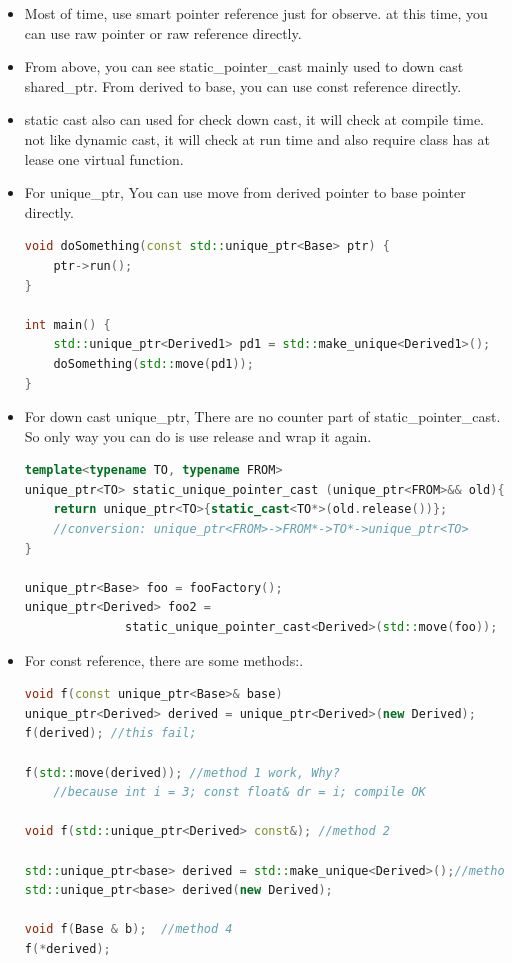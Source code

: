 \documentclass[a4paper,11pt,twoside]{book}
\begin{document}
\begin{itemize}
\item Most of time, use smart pointer reference just for observe. at this time, you can use raw pointer or raw reference directly. 

\item From above, you can see static\_pointer\_cast mainly used to down cast shared\_ptr. From derived to base, you can use const reference directly.

\item static cast also can used for check down cast, it will check at compile time. not like dynamic cast, it will check at run time and also require class has at lease one virtual function.


\item For unique\_ptr, You can use move from derived pointer to base pointer directly.
\begin{lstlisting}[frame=single, language=c++, mathescape=true]
void doSomething(const std::unique_ptr<Base> ptr) {
    ptr->run();
}

int main() {
    std::unique_ptr<Derived1> pd1 = std::make_unique<Derived1>();
    doSomething(std::move(pd1));
}
\end{lstlisting}

\item For down cast unique\_ptr, There are no counter part of static\_pointer\_cast. So only way you can do is use release and wrap it again.

\begin{lstlisting}[frame=single, language=c++, mathescape=true]
template<typename TO, typename FROM>
unique_ptr<TO> static_unique_pointer_cast (unique_ptr<FROM>&& old){
	return unique_ptr<TO>{static_cast<TO*>(old.release())};
	//conversion: unique_ptr<FROM>->FROM*->TO*->unique_ptr<TO>
}

unique_ptr<Base> foo = fooFactory();
unique_ptr<Derived> foo2 = 
              static_unique_pointer_cast<Derived>(std::move(foo));
\end{lstlisting}

\item For const reference, there are some methods:.
\begin{lstlisting}[frame=single, language=c++, mathescape=true]
void f(const unique_ptr<Base>& base)
unique_ptr<Derived> derived = unique_ptr<Derived>(new Derived);
f(derived); //this fail;

f(std::move(derived)); //method 1 work, Why?
    //because int i = 3; const float& dr = i; compile OK
                       
void f(std::unique_ptr<Derived> const&); //method 2

std::unique_ptr<base> derived = std::make_unique<Derived>();//method 3 
std::unique_ptr<base> derived(new Derived);

void f(Base & b);  //method 4
f(*derived);
\end{lstlisting}

\end{itemize}
\end{document}
